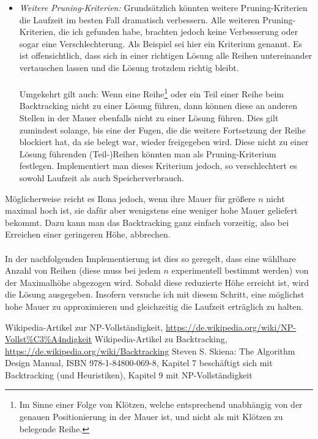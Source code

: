 \documentclass[a4paper, notitlepage, 12pt]{scrartcl}
\begin{document}
\begin{itemize}
\item \textit{Weitere Pruning-Kriterien:} Grundsätzlich könnten weitere Pruning-Kriterien die Laufzeit im besten Fall dramatisch verbessern. Alle weiteren Pruning-Kriterien, die ich gefunden habe, brachten jedoch keine Verbesserung oder sogar eine Verschlechterung. Als Beispiel sei hier ein Kriterium genannt. Es ist offensichtlich, dass sich in einer richtigen Lösung alle Reihen untereinander vertauschen lassen und die Lösung trotzdem richtig bleibt. \\ \\ Umgekehrt gilt auch: Wenn eine Reihe\footnote{Im Sinne einer Folge von Klötzen, welche entsprechend unabhängig von der genauen Positionierung in der Mauer ist, und nicht als mit Klötzen zu belegende Reihe.} oder ein Teil einer Reihe beim Backtracking nicht zu einer Lösung führen, dann können diese an anderen Stellen in der Mauer ebenfalls nicht zu einer Lösung führen. Dies gilt zumindest solange, bis eine der Fugen, die die weitere Fortsetzung der Reihe blockiert hat, da sie belegt war, wieder freigegeben wird. Diese nicht zu einer Lösung führenden (Teil-)Reihen könnten man als Pruning-Kriterium festlegen. Implementiert man dieses Kriterium jedoch, so verschlechtert es sowohl Laufzeit als auch Speicherverbrauch.
\end{itemize}
Möglicherweise reicht es Ilona jedoch, wenn ihre Mauer für größere $n$ nicht maximal hoch ist, sie dafür aber wenigstens eine weniger hohe Mauer geliefert bekommt. Dazu kann man das Backtracking ganz einfach vorzeitig, also bei Erreichen einer geringeren Höhe, abbrechen. \\ \\ In der nachfolgenden Implementierung ist dies so geregelt, dass eine wählbare Anzahl von Reihen (diese muss bei jedem $n$ experimentell bestimmt werden) von der Maximalhöhe abgezogen wird. Sobald diese reduzierte Höhe erreicht ist, wird die Lösung ausgegeben. Insofern versuche ich mit diesem Schritt, eine möglichst hohe Mauer zu approximieren und gleichzeitig die Laufzeit erträglich zu halten.
\begin{thebibliography}{xx}
 Wikipedia-Artikel zur NP-Vollständigkeit, \url{https://de.wikipedia.org/wiki/NP-Vollst\%C3\%A4ndigkeit}
 Wikipedia-Artikel zu Backtracking, \url{https://de.wikipedia.org/wiki/Backtracking}
 Steven S. Skiena: The Algorithm Design Manual, ISBN 978-1-84800-069-8, Kapitel 7 beschäftigt sich mit Backtracking (und Heuristiken), Kapitel 9 mit NP-Vollständigkeit
\end{thebibliography}
\end{document}
